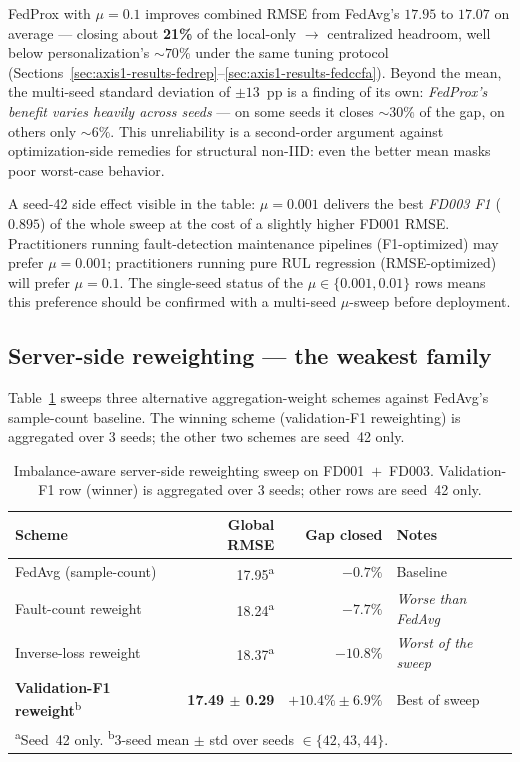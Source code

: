 \documentclass[preprint,12pt,authoryear]{elsarticle}
\begin{document}
FedProx with $\mu = 0.1$ improves combined RMSE from FedAvg's $17.95$
to $17.07$ on average --- closing about \textbf{21\%} of the local-only
$\to$ centralized headroom, well below personalization's $\sim 70\%$
under the same tuning protocol (Sections~\ref{sec:axis1-results-fedrep}--\ref{sec:axis1-results-fedccfa}).
Beyond the mean, the multi-seed standard deviation of
$\pm 13$~pp is a finding of its own: \emph{FedProx's benefit varies
heavily across seeds} --- on some seeds it closes $\sim 30\%$ of the
gap, on others only $\sim 6\%$. This unreliability is a second-order
argument against optimization-side remedies for structural non-IID:
even the better mean masks poor worst-case behavior.

A seed-42 side effect visible in the table: $\mu = 0.001$ delivers the
best \emph{FD003 F1} ($0.895$) of the whole sweep at the cost of a
slightly higher FD001 RMSE. Practitioners running fault-detection
maintenance pipelines (F1-optimized) may prefer $\mu = 0.001$;
practitioners running pure RUL regression (RMSE-optimized) will prefer
$\mu = 0.1$. The single-seed status of the $\mu \in \{0.001, 0.01\}$
rows means this preference should be confirmed with a multi-seed
$\mu$-sweep before deployment.

\subsection{Server-side reweighting --- the weakest family}
\label{sec:axis1-results-reweight}

Table~\ref{tab:reweight} sweeps three alternative aggregation-weight
schemes against FedAvg's sample-count baseline. The winning scheme
(validation-F1 reweighting) is aggregated over 3 seeds; the other two
schemes are seed~42 only.

\begin{table}[!ht]
\centering
\small
\caption{Imbalance-aware server-side reweighting sweep on
FD001~$+$~FD003. Validation-F1 row (winner) is aggregated over 3 seeds;
other rows are seed~42 only.}
\label{tab:reweight}
\begin{tabular}{lrrl}
\toprule
Scheme & Global RMSE & Gap closed & Notes \\
\midrule
FedAvg (sample-count) & 17.95\textsuperscript{a} & $-0.7\%$ & Baseline \\
Fault-count reweight & 18.24\textsuperscript{a} & $-7.7\%$ & \emph{Worse than FedAvg} \\
Inverse-loss reweight & 18.37\textsuperscript{a} & $-10.8\%$ & \emph{Worst of the sweep} \\
\textbf{Validation-F1 reweight}\textsuperscript{b} & \textbf{17.49 $\pm$ 0.29} & \textbf{$+10.4\% \pm 6.9\%$} & Best of sweep \\
\bottomrule
\multicolumn{4}{l}{\footnotesize\textsuperscript{a}Seed~42 only. \textsuperscript{b}3-seed mean $\pm$ std over seeds $\in \{42, 43, 44\}$.} \\
\end{tabular}
\end{table}
\end{document}
